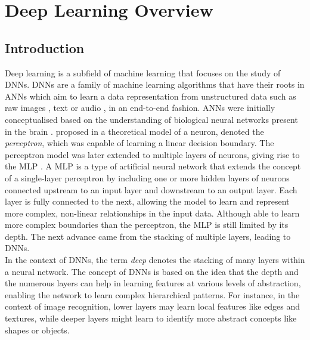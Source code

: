\chapter{Deep Learning Overview}\label{chap:dlo}

\localtableofcontents

\section{Introduction}

Deep learning is a subfield of machine learning that focuses on the study of
\acp{DNN}. \acp{DNN} are a family of machine learning algorithms that have their
roots in \acp{ANN} which aim to learn a data representation from unstructured
data such as raw images \cite{DBLP:conf/nips/KrizhevskySH12}, text
\cite{DBLP:conf/emnlp/BudzianowskiV19} or audio
\cite{DBLP:journals/corr/HannunCCCDEPSSCN14}, in an end-to-end fashion.
\acp{ANN} were initially conceptualised based on the understanding of biological
neural networks present in the brain
\cite{mcculloch1943logical,hebb2005organization}.
\citeauthor{rosenblatt1958perceptron} proposed in
\cite{rosenblatt1958perceptron} a theoretical model of a neuron, denoted the
\emph{perceptron}, which was capable of learning a linear decision boundary. The
perceptron model was later extended to multiple layers of neurons, giving rise
to the \ac{MLP} \cite{rosenblatt1961principles,rumelhart1986learning}. A
\acl{MLP} is a type of artificial neural network that extends the concept of a
single-layer perceptron by including one or more hidden layers of neurons
connected upstream to an input layer and downstream to an output layer. Each
layer is fully connected to the next, allowing the model to learn and represent
more complex, non-linear relationships in the input data. Although able to learn
more complex boundaries than the perceptron, the \ac{MLP} is still limited by
its depth. The next advance came from the stacking of multiple layers, leading
to \aclp{DNN}.\\

In the context of \acp{DNN}, the term \emph{deep} denotes the stacking of many
layers within a neural network. The concept of \acp{DNN} is based on the idea
that the depth and the numerous layers can help in learning features at various
levels of abstraction, enabling the network to learn complex hierarchical
patterns. For instance, in the context of image recognition, lower layers may
learn local features like edges and textures, while deeper layers might learn to
identify more abstract concepts like shapes or objects.\\

